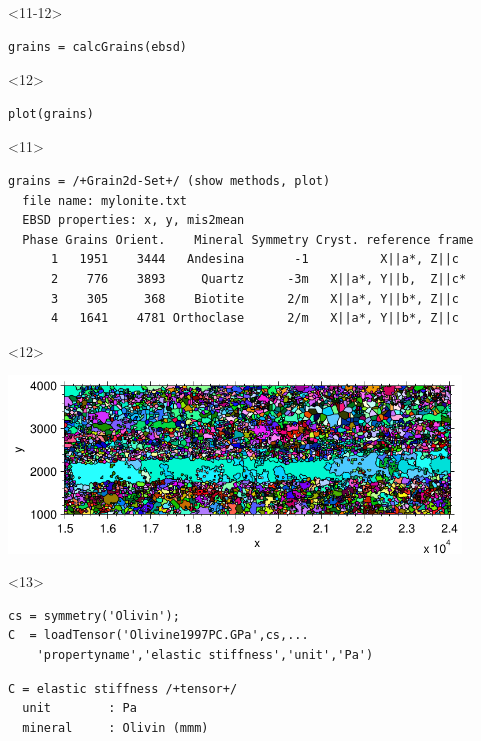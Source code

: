 \documentclass[comptress]{beamer}
\begin{document}
\begin{frame}[fragile]
\begin{overlayarea}{\textwidth}{5.5cm}
\begin{onlyenv}
\end{onlyenv}
\begin{onlyenv}<11-12>
  \begin{lstlisting}[style=input]
grains = calcGrains(ebsd)
  \end{lstlisting}
\end{onlyenv}
\begin{onlyenv}<12>
  \vspace{-0.4cm}
  \begin{lstlisting}[style=input]
plot(grains)
  \end{lstlisting}
\end{onlyenv}
\begin{onlyenv}<11>
  \begin{lstlisting}[style=output]
grains = /+Grain2d-Set+/ (show methods, plot)
  file name: mylonite.txt
  EBSD properties: x, y, mis2mean
  Phase Grains Orient.    Mineral Symmetry Cryst. reference frame
      1   1951    3444   Andesina       -1          X||a*, Z||c
      2    776    3893     Quartz      -3m   X||a*, Y||b,  Z||c*
      3    305     368    Biotite      2/m   X||a*, Y||b*, Z||c
      4   1641    4781 Orthoclase      2/m   X||a*, Y||b*, Z||c
  \end{lstlisting}
\end{onlyenv}
\begin{onlyenv}<12>
  \centerline{
  \includegraphics[width=0.9\textwidth]{pic/grainsMylonite}
  }
\end{onlyenv}
\begin{onlyenv}<13>
  \begin{lstlisting}[style=input]
cs = symmetry('Olivin');
C  = loadTensor('Olivine1997PC.GPa',cs,...
    'propertyname','elastic stiffness','unit','Pa')
  \end{lstlisting}
  \vspace{-.3cm}
  \begin{lstlisting}[style=output]
C = elastic stiffness /+tensor+/
  unit        : Pa
  mineral     : Olivin (mmm)


\end{lstlisting}
\end{onlyenv}
\end{overlayarea}
\end{frame}
\end{document}
